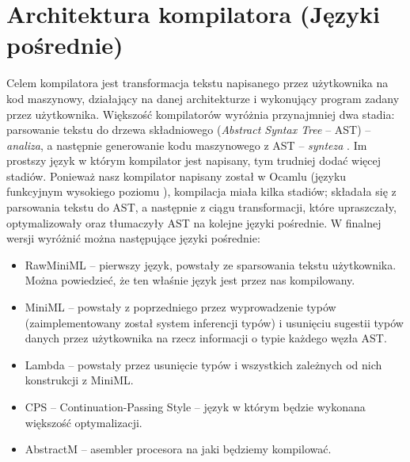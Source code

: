 \documentclass[11pt]{scrartcl}
\begin{document}
\section{Architektura kompilatora (Języki pośrednie)}
Celem kompilatora jest transformacja tekstu napisanego przez użytkownika
na kod maszynowy, działający na danej architekturze i wykonujący program zadany
przez użytkownika.
Większość kompilatorów wyróżnia przynajmniej dwa stadia: parsowanie tekstu do
drzewa składniowego (\textit{Abstract Syntax Tree} -- AST) -- \textit{analiza}, a następnie
generowanie kodu maszynowego z AST -- \textit{synteza} \cite{Dragonbook}.
Im prostszy język w którym kompilator jest napisany, tym trudniej dodać więcej
stadiów.
Ponieważ nasz kompilator napisany został w Ocamlu (języku funkcyjnym wysokiego
poziomu \cite{Leroy16}), kompilacja miała kilka stadiów; składała się z parsowania tekstu do
AST, a następnie z ciągu transformacji, które upraszczały, optymalizowały oraz
tłumaczyły AST na kolejne języki pośrednie.
W finalnej wersji wyróżnić można następujące języki pośrednie:
\begin{itemize}
\item RawMiniML -- pierwszy język, powstały ze sparsowania tekstu użytkownika.
  Można powiedzieć, że ten właśnie język jest przez nas kompilowany.
\item MiniML -- powstały z poprzedniego przez wyprowadzenie typów
  (zaimplementowany został system inferencji typów) i usunięciu sugestii typów
  danych przez użytkownika na rzecz informacji o typie każdego węzła AST.
\item Lambda -- powstały przez usunięcie typów i wszystkich zależnych od nich konstrukcji z MiniML.
\item CPS -- Continuation-Passing Style -- język w którym będzie wykonana większość optymalizacji.
\item AbstractM -- asembler procesora na jaki będziemy kompilować.
\end{itemize}
\end{document}

